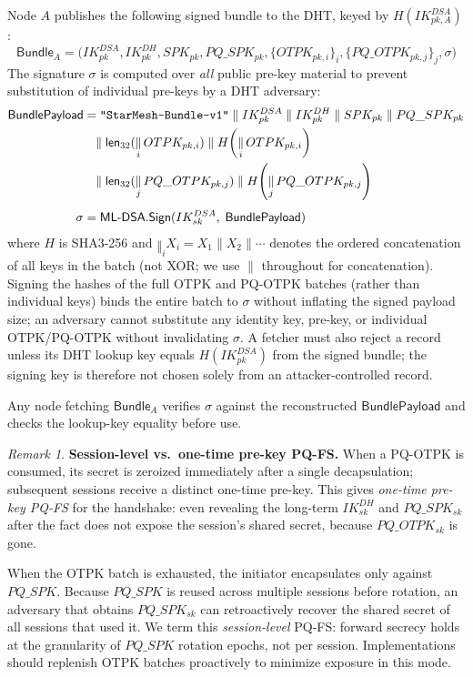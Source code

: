 \documentclass[11pt,a4paper]{article}
\theoremstyle{remark}
\newtheorem{remark}[theorem]{Remark}
\theoremstyle{plain}
\newcommand{\MLDSA}{\mathsf{ML\text{-}DSA}}
\newcommand{\Sign}{\mathsf{Sign}}
\newcommand{\flen}[1]{\mathsf{len}_{32}(#1)}
\newcommand{\bigcat}[2]{\displaystyle\mathop{\Vert}_{#1} #2}
\newcommand{\strlit}[1]{\text{\upshape\texttt{"#1"}}}
\begin{document}
Node $A$ publishes the following signed bundle to the DHT, keyed by $H(IK^{DSA}_{pk,A})$:
\[
  \mathsf{Bundle}_A = \bigl(IK^{DSA}_{pk}, IK^{DH}_{pk}, SPK_{pk}, PQ\_SPK_{pk},
                             \{OTPK_{pk,i}\}_{i}, \{PQ\_OTPK_{pk,j}\}_{j}, \sigma\bigr)
\]
The signature $\sigma$ is computed over \emph{all} public pre-key material to prevent
substitution of individual pre-keys by a DHT adversary:
\begin{align*}
      \mathsf{BundlePayload} &=
                        \strlit{StarMesh-Bundle-v1} \;\|\;
                        IK^{DSA}_{pk} \;\|\; IK^{DH}_{pk} \;\|\;
                        SPK_{pk} \;\|\; PQ\_SPK_{pk} \\
        &\quad\|\; \flen{\bigcat{i}{OTPK_{pk,i}}}
             \;\|\; H\!\left(\bigcat{i}{OTPK_{pk,i}}\right) \\
        &\quad\|\; \flen{\bigcat{j}{PQ\_OTPK_{pk,j}}}
             \;\|\; H\!\left(\bigcat{j}{PQ\_OTPK_{pk,j}}\right) \\[4pt]
  \sigma &= \MLDSA.\Sign(IK^{DSA}_{sk},\; \mathsf{BundlePayload})
\end{align*}
where $H$ is SHA3-256 and $\bigcat{i}{X_i} = X_1 \| X_2 \| \cdots$ denotes the ordered
concatenation of all keys in the batch (not XOR; we use $\|$ throughout for concatenation).
Signing the hashes of the full OTPK and PQ-OTPK batches (rather than individual keys) binds
the entire batch to $\sigma$ without inflating the signed payload size; an adversary cannot
substitute any identity key, pre-key, or individual OTPK/PQ-OTPK without invalidating
$\sigma$.  A fetcher must also reject a record unless its DHT lookup key equals
$H(IK^{DSA}_{pk})$ from the signed bundle; the signing key is therefore not chosen solely
from an attacker-controlled record.

Any node fetching $\mathsf{Bundle}_A$ verifies $\sigma$ against the reconstructed
$\mathsf{BundlePayload}$ and checks the lookup-key equality before use.

\begin{remark}
\label{rem:spkonly}
\textbf{Session-level vs.\ one-time pre-key PQ-FS.}  When a PQ-OTPK is consumed, its secret
is zeroized immediately after a single decapsulation; subsequent sessions receive a distinct
one-time pre-key.  This gives \emph{one-time pre-key PQ-FS} for the handshake: even revealing
the long-term $IK^{DH}_{sk}$ and $PQ\_SPK_{sk}$ after the fact does not expose the session's
shared secret, because $PQ\_OTPK_{sk}$ is gone.

When the OTPK batch is exhausted, the initiator encapsulates only against $PQ\_SPK$.  Because
$PQ\_SPK$ is reused across multiple sessions before rotation, an adversary that obtains
$PQ\_SPK_{sk}$ can retroactively recover the shared secret of all sessions that used it.  We
term this \emph{session-level} PQ-FS: forward secrecy holds at the granularity of $PQ\_SPK$
rotation epochs, not per session.  Implementations should replenish OTPK batches proactively to
minimize exposure in this mode.
\end{remark}
\end{document}
